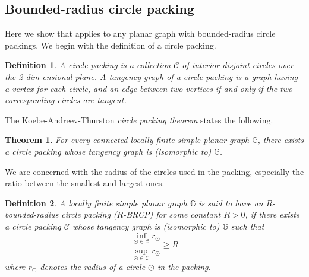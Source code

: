 \documentclass[10pt,a4paper]{article}
\newtheorem{theorem}{Theorem}[section]
\newtheorem{corollary}{Corollary}[section]
\newtheorem{definition}{Definition}[section]
\def\=#1{\mathbb{#1}}
\newcommand{\eps}{\varepsilon}
\begin{document}
%

\subsection{Bounded-radius circle packing}\label{sec:circle-packing}

Here we show that  applies to any planar graph with bounded-radius circle packings.
We begin with the definition of a circle packing. 
\begin{definition}
A \emph{circle packing} is a collection $\mathcal{C}$ of interior-disjoint circles over the 2-dim-ensional plane. 
A \emph{tangency graph} of a circle packing is a graph having a vertex for each circle, and an edge between two vertices if and only if the two corresponding circles are tangent. 
\end{definition}

The Koebe-Andreev-Thurston \emph{circle packing theorem} states the following.
\begin{theorem}
For every connected locally finite simple planar graph $\mathbb{G}$, there exists a circle packing whose tangency graph is (isomorphic to) $\mathbb{G}$. 
\end{theorem}

We are concerned with the radius of the circles used in the packing, especially the ratio between the smallest and largest ones. 
\begin{definition}
  A locally finite simple planar graph $\mathbb{G}$ is said to have an \emph{$R$-bounded-radius circle packing} ($R$-BRCP) for some constant $R>0$, if there exists a circle packing $\mathcal{C}$ whose tangency graph is (isomorphic to) $\mathbb{G}$ such that
\[
\frac{\inf\limits_{\odot\in\mathcal{C}}r_{\odot}}{\sup\limits_{\odot\in\mathcal{C}}r_{\odot}}\geq R
\]
where $r_{\odot}$ denotes the radius of a circle $\odot$ in the packing. 
\end{definition}
\end{document}
